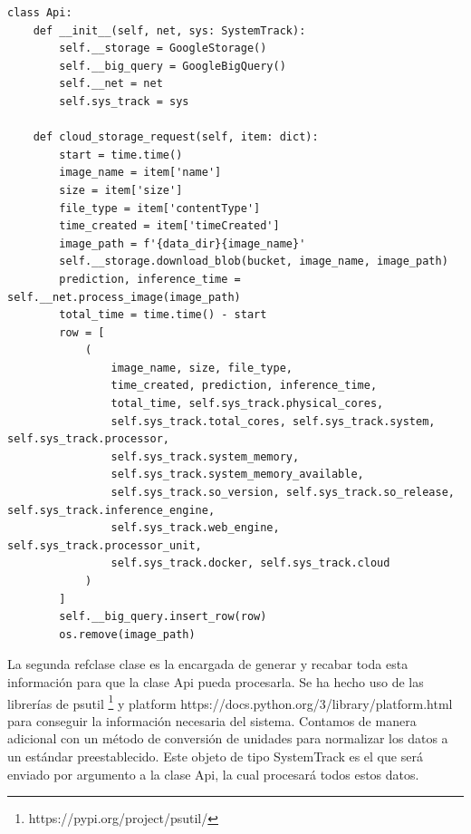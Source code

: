 \begin{lstlisting}[caption=Api, label=lst:api, float=h]
    class Api:
    def __init__(self, net, sys: SystemTrack):
        self.__storage = GoogleStorage()
        self.__big_query = GoogleBigQuery()
        self.__net = net
        self.sys_track = sys

    def cloud_storage_request(self, item: dict):
        start = time.time()
        image_name = item['name']
        size = item['size']
        file_type = item['contentType']
        time_created = item['timeCreated']
        image_path = f'{data_dir}{image_name}'
        self.__storage.download_blob(bucket, image_name, image_path)
        prediction, inference_time = self.__net.process_image(image_path)
        total_time = time.time() - start
        row = [
            (
                image_name, size, file_type,
                time_created, prediction, inference_time,
                total_time, self.sys_track.physical_cores,
                self.sys_track.total_cores, self.sys_track.system, self.sys_track.processor,
                self.sys_track.system_memory,
                self.sys_track.system_memory_available,
                self.sys_track.so_version, self.sys_track.so_release, self.sys_track.inference_engine,
                self.sys_track.web_engine, self.sys_track.processor_unit,
                self.sys_track.docker, self.sys_track.cloud
            )
        ]
        self.__big_query.insert_row(row)
        os.remove(image_path)
\end{lstlisting}
La segunda refclase clase es la encargada de generar y recabar toda esta información para que la clase Api pueda procesarla.
Se ha hecho uso de las librerías de psutil \footnote{ https://pypi.org/project/psutil/} y platform {https://docs.python.org/3/library/platform.html} para conseguir la información necesaria del sistema.
Contamos de manera adicional con un método de conversión de unidades para normalizar los datos a un estándar preestablecido.
Este objeto de tipo SystemTrack es el que será enviado por argumento a la clase Api, la cual procesará todos estos datos.
